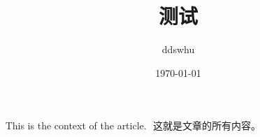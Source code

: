 \documentclass[UTF8]{ctexart}
\title{测试}
\author{ddswhu}
\date{\today}
\begin{document}
    \maketitle
    ​
    This is the context of the article.
    ​
    这就是文章的所有内容。
    ​
    
\end{document}
